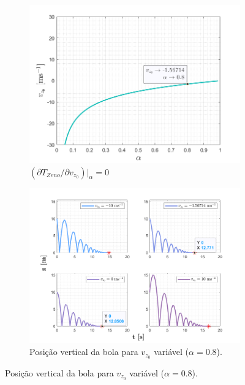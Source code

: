 \vspace{-0.75em}
\begin{figure}[ht] 
     \begin{subfigure}[b]{0.33\linewidth}
        \centering
        \includegraphics[width=1\linewidth]{img/P1/P1-DerivadaShenanigan.png} 
        \caption{$(\partial T_{Zeno}/\partial v_{z_0})|_{\alpha} = 0 $\protect\footnotemark[2]\\ \vphantom{}} 
        \label{fig:Derivada} 
    \end{subfigure}%
    \begin{subfigure}[b]{0.33\linewidth}
        \centering
        \includegraphics[width=1\linewidth]{img/P1/P1-velomatrix.png} 
        \caption{Posição vertical da bola para $v_{z_0}$ variável ($\alpha = 0.8$).} 

\end{subfigure}
\end{figure}
